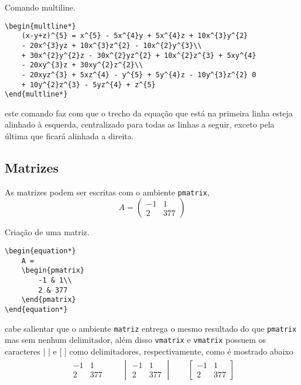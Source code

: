 \begin{programcode}{Comando multiline.}
\begin{verbatim}
\begin{multline*}
    (x-y+z)^{5} = x^{5} - 5x^{4}y + 5x^{4}z + 10x^{3}y^{2} 
    - 20x^{3}yz + 10x^{3}z^{2} - 10x^{2}y^{3}\\
    + 30x^{2}y^{2}z - 30x^{2}yz^{2} + 10x^{2}z^{3} + 5xy^{4} 
    - 20xy^{3}z + 30xy^{2}z^{2}\\
    - 20xyz^{3} + 5xz^{4} - y^{5} + 5y^{4}z - 10y^{3}z^{2} 0
    + 10y^{2}z^{3} - 5yz^{4} + z^{5}
\end{multline*}
\end{verbatim}
\end{programcode}

\noindent este comando faz com que o trecho da equa\c c\~{a}o que est\'{a} na primeira linha esteja alinhado \`{a} esquerda, centralizado para todas as linhas a seguir, exceto pela \'{u}ltima que ficar\'{a} alinhada a direita.

\subsection{Matrizes}
As matrizes podem ser escritas com o ambiente \verb|pmatrix|,
\begin{equation*}
    A = 
    \begin{pmatrix}
        -1 & 1\\
        2 & 377
    \end{pmatrix}     
\end{equation*}

\begin{programcode}{Criação de uma matriz.}
\begin{verbatim}
\begin{equation*}
    A = 
    \begin{pmatrix}
        -1 & 1\\
        2 & 377
    \end{pmatrix}     
\end{equation*}
\end{verbatim}
\end{programcode}

\noindent cabe salientar que o ambiente \verb|matriz| entrega o mesmo resultado do que \verb|pmatrix| mas sem nenhum delimitador, al\'{e}m disso \verb|vmatrix| e \verb|vmatrix| possuem os caracteres | | e [ ] como delimitadores, respectivamente, como \'{e} mostrado abaixo
\begin{align*}
    \begin{matrix}
        -1 & 1\\
        2 & 377
    \end{matrix}
    \qquad
    \begin{vmatrix}
        -1 & 1\\
        2 & 377
    \end{vmatrix}
    \qquad
    \begin{bmatrix}
        -1 & 1\\
        2 & 377
    \end{bmatrix}
\end{align*}

